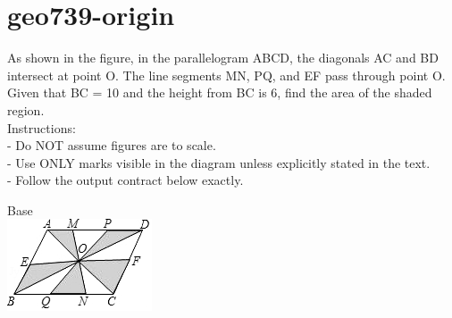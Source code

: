\documentclass[12pt]{article}
\begin{document}
\section*{geo739-origin}
\noindent\begin{minipage}{\textwidth}
\setlength{\parskip}{4pt}
As shown in the figure, in the parallelogram ABCD, the diagonals AC and BD intersect at point O. The line segments MN, PQ, and EF pass through point O. Given that BC = 10 and the height from BC is 6, find the area of the shaded region.\\
Instructions:\\
- Do NOT assume figures are to scale.\\
- Use ONLY marks visible in the diagram unless explicitly stated in the text.\\
- Follow the output contract below exactly.\\
\end{minipage}
\begin{center}
\begin{minipage}{0.32\textwidth}\centering
Base\\
\includegraphics[width=0.95\linewidth]{out_rommath_origin/items/geo739-origin/assets/figure.png}
\end{minipage}
\par
\end{center}
\bigskip
\end{document}
